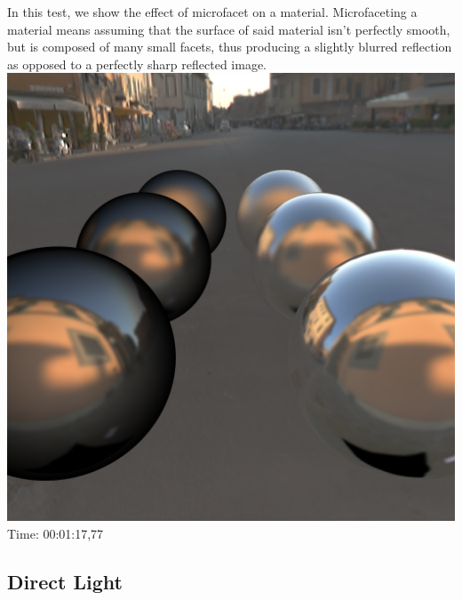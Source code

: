 \documentclass[12pt]{article} %
\begin{document}
In this test, we show the effect of microfacet on a material. Microfaceting a material means assuming that the surface of said material isn't perfectly smooth, but is composed of many small facets, thus producing a slightly blurred reflection as opposed to a perfectly sharp reflected image.\\
\includegraphics[width=\linewidth]{Homework4/tests/05_materials.png}
Time: 00:01:17,77

\subsection{Direct Light} 
\end{document}

